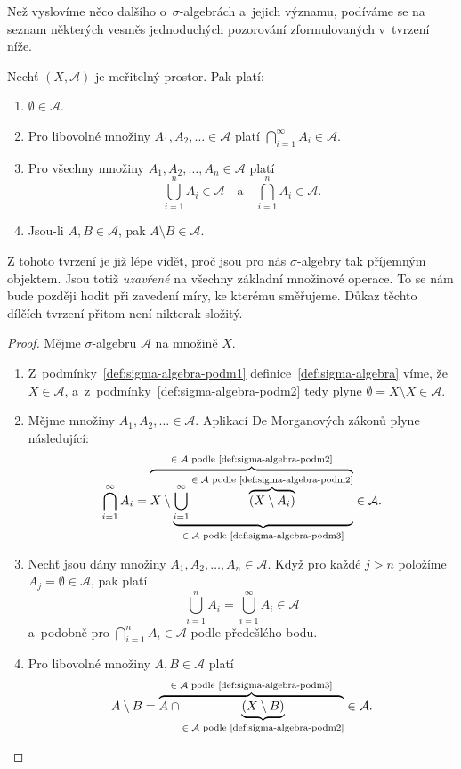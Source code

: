 Než vyslovíme něco dalšího o~$\sigma$-algebrách a~jejich významu, podíváme se na seznam některých vesměs jednoduchých pozorování zformulovaných v~tvrzení níže.
\begin{theorem}\label{thm:sigma-algebra-vlastnosti}
    Nechť $(X,\mathcal{A})$ je meřitelný prostor. Pak platí:
    \begin{enumerate}[label=(\roman*)]
        \item $\emptyset\in\mathcal{A}$.
        \item Pro libovolné množiny $A_1,A_2,\ldots\in\mathcal{A}$ platí $\bigcap_{i=1}^\infty A_i\in\mathcal{A}$.
        \item Pro všechny množiny $A_1,A_2,\ldots,A_n\in\mathcal{A}$ platí
        \[\bigcup_{i=1}^n A_i\in\mathcal{A}\quad\text{a}\quad\bigcap_{i=1}^n A_i\in\mathcal{A}.\]
        \item Jsou-li $A,B\in\mathcal{A}$, pak $A\setminus B\in\mathcal{A}$.
    \end{enumerate}
\end{theorem}

Z tohoto tvrzení je již lépe vidět, proč jsou pro nás $\sigma$-algebry tak příjemným objektem. Jsou totiž \emph{uzavřené} na všechny základní množinové operace. To se nám bude později hodit při zavedení míry, ke kterému směřujeme. Důkaz těchto dílčích tvrzení přitom není nikterak složitý.
\begin{proof}
    Mějme $\sigma$-algebru $\mathcal{A}$ na množině $X$.
    \begin{enumerate}[label=\textit{(\roman*)}]
        \item Z~podmínky~\ref{def:sigma-algebra-podm1} definice~\ref{def:sigma-algebra} víme, že $X\in\mathcal{A}$, a~z~podmínky~\ref{def:sigma-algebra-podm2} tedy plyne $\emptyset=X\setminus X\in\mathcal{A}$.
        \item Mějme množiny $A_1,A_2,\ldots\in\mathcal{A}$. Aplikací De Morganových zákonů plyne následující:
        \[\bigcap\limits_{i=1}^\infty A_i=\overbrace{X\setminus\underbrace{\bigcup\limits_{i=1}^\infty \overbrace{(X\setminus A_i)}^{\text{$\in\mathcal{A}$ podle~\ref{def:sigma-algebra-podm2}}}}_{\text{$\in\mathcal{A}$ podle~\ref{def:sigma-algebra-podm3}}}}^\text{$\in\mathcal{A}$ podle~\ref{def:sigma-algebra-podm2}}\in\mathcal{A}.\]
        \item Nechť jsou dány množiny $A_1,A_2,\ldots,A_n\in\mathcal{A}$. Když pro každé $j>n$ položíme $A_j=\emptyset\in\mathcal{A}$, pak platí
        \[\bigcup\limits_{i=1}^n A_i=\bigcup\limits_{i=1}^\infty A_i\in\mathcal{A}\]
        a~podobně pro $\bigcap_{i=1}^n A_i\in\mathcal{A}$ podle předešlého bodu.
        \item Pro libovolné množiny $A,B\in\mathcal{A}$ platí
        \[A\setminus B=\overbrace{A\cap\underbrace{(X\setminus B)}_{\text{$\in\mathcal{A}$ podle~\ref{def:sigma-algebra-podm2}}}}^{\text{$\in\mathcal{A}$ podle~\ref{def:sigma-algebra-podm3}}}\in\mathcal{A}.\]
    \end{enumerate}
\end{proof}

